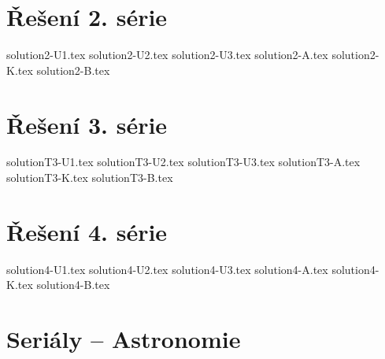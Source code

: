\documentclass{../../style/mkibrochure}
\begin{document}

\section*{\centering Řešení 2. série}
{solution2-U1.tex}
{solution2-U2.tex}
\newpage
{solution2-U3.tex}
{solution2-A.tex}
{solution2-K.tex}
{solution2-B.tex}
\newpage



\section*{\centering Řešení 3. série}
{solutionT3-U1.tex}
{solutionT3-U2.tex}
\newpage
{solutionT3-U3.tex}
{solutionT3-A.tex}
{solutionT3-K.tex}
{solutionT3-B.tex}
\newpage



\section*{\centering Řešení 4. série}
{solution4-U1.tex}
{solution4-U2.tex}
{solution4-U3.tex}
{solution4-A.tex}
\newpage
{solution4-K.tex}
\newpage
{solution4-B.tex}
\newpage


\section*{\centering Seriály -- Astronomie}
\newpage
\end{document}
